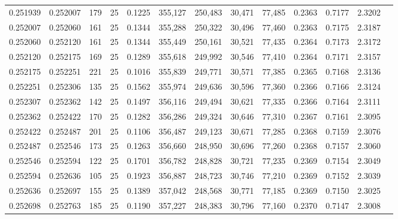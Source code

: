 \begin{tabular}{rrrrrrrrrrrrr}
0.251939 & 0.252007 &   179 &  25 &                                     0.1225 & 355,127 & 250,483 &  30,471 &  77,485 & 0.2363 & 0.7177 & 2.3202 \\
0.252007 & 0.252060 &   161 &  25 &                                     0.1344 & 355,288 & 250,322 &  30,496 &  77,460 & 0.2363 & 0.7175 & 2.3187 \\
0.252060 & 0.252120 &   161 &  25 &                                     0.1344 & 355,449 & 250,161 &  30,521 &  77,435 & 0.2364 & 0.7173 & 2.3172 \\
0.252120 & 0.252175 &   169 &  25 &                                     0.1289 & 355,618 & 249,992 &  30,546 &  77,410 & 0.2364 & 0.7171 & 2.3157 \\
0.252175 & 0.252251 &   221 &  25 &                                     0.1016 & 355,839 & 249,771 &  30,571 &  77,385 & 0.2365 & 0.7168 & 2.3136 \\
0.252251 & 0.252306 &   135 &  25 &                                     0.1562 & 355,974 & 249,636 &  30,596 &  77,360 & 0.2366 & 0.7166 & 2.3124 \\
0.252307 & 0.252362 &   142 &  25 &                                     0.1497 & 356,116 & 249,494 &  30,621 &  77,335 & 0.2366 & 0.7164 & 2.3111 \\
0.252362 & 0.252422 &   170 &  25 &                                     0.1282 & 356,286 & 249,324 &  30,646 &  77,310 & 0.2367 & 0.7161 & 2.3095 \\
0.252422 & 0.252487 &   201 &  25 &                                     0.1106 & 356,487 & 249,123 &  30,671 &  77,285 & 0.2368 & 0.7159 & 2.3076 \\
0.252487 & 0.252546 &   173 &  25 &                                     0.1263 & 356,660 & 248,950 &  30,696 &  77,260 & 0.2368 & 0.7157 & 2.3060 \\
0.252546 & 0.252594 &   122 &  25 &                                     0.1701 & 356,782 & 248,828 &  30,721 &  77,235 & 0.2369 & 0.7154 & 2.3049 \\
0.252594 & 0.252636 &   105 &  25 &                                     0.1923 & 356,887 & 248,723 &  30,746 &  77,210 & 0.2369 & 0.7152 & 2.3039 \\
0.252636 & 0.252697 &   155 &  25 &                                     0.1389 & 357,042 & 248,568 &  30,771 &  77,185 & 0.2369 & 0.7150 & 2.3025 \\
0.252698 & 0.252763 &   185 &  25 &                                     0.1190 & 357,227 & 248,383 &  30,796 &  77,160 & 0.2370 & 0.7147 & 2.3008 \\

\end{tabular}

